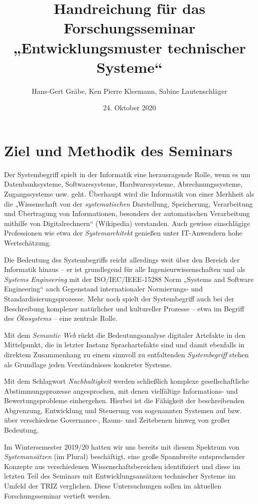 \documentclass[11pt,a4paper]{article}
\title{Handreichung für das Forschungsseminar\\ „Entwicklungsmuster
  technischer Systeme“}
\author{Hans-Gert Gr\"abe, Ken Pierre Kleemann, Sabine Lautenschläger}
\date{24. Oktober 2020}
\begin{document}
\maketitle

\section{Ziel und Methodik des Seminars}

Der Systembegriff spielt in der Informatik eine herausragende Rolle, wenn es
um Datenbanksysteme, Softwaresysteme, Hardwaresysteme, Abrechnungssysteme,
Zugangssysteme usw. geht.  Überhaupt wird die Informatik von einer Merhheit
als die „Wissenschaft von der \emph{systematischen} Darstellung, Speicherung,
Verarbeitung und Übertragung von Informationen, besonders der automatischen
Verarbeitung mithilfe von Digitalrechnern“ (Wikipedia) verstanden.  Auch
gewisse einschlägige Professionen wie etwa der \emph{Systemarchitekt} genießen
unter IT-Anwendern hohe Wertschätzung.

Die Bedeutung des Systembegriffs reicht allerdings weit über den Bereich der
Informatik hinaus -- er ist grundlegend für alle Ingenieurwissenschaften und
als \emph{Systems Engineering} mit der ISO/IEC/IEEE-15288 Norm „Systems and
Software Engineering“ auch Gegenstand internationaler Normierungs- und
Standardisierungsprozesse.  Mehr noch spielt der Systembegriff auch bei der
Beschreibung komplexer natürlicher und kultureller Prozesse -- etwa im Begriff
des \emph{Ökosystems} -- eine zentrale Rolle.

Mit dem \emph{Semantic Web} rückt die Bedeutungsanalyse digitaler Artefakte in
den Mittelpunkt, die in letzter Instanz Sprachartefakte sind und damit
ebenfalls in direktem Zusammenhang zu einem sinnvoll zu entfaltenden
\emph{Systembegriff} stehen als Grundlage jeden Verständnisses konkreter
Systeme.

Mit dem Schlagwort \emph{Nachhaltigkeit} werden schließlich komplexe
gesellschaftliche Abstimmungsprozesse angesprochen, mit denen vielfältige
Informations- und Bewertungsprobleme einhergehen. Hierbei ist die Fähigkeit
der beschreibenden Abgrenzung, Entwicklung und Steuerung von sogenannten
Systemen auf bzw. über verschiedene Governance-, Raum- und Zeitebenen hinweg
von großer Bedeutung.

Im Wintersemester 2019/20 hatten wir uns bereits mit diesem Spektrum von
\emph{Systemansätzen} (im Plural) beschäftigt, eine große Spannbreite
entsprechender Konzepte aus verschiedenen Wissenschaftsbereichen identifiziert
und diese im letzten Teil des Seminars mit Entwicklungsansätzen technischer
Systeme im Umfeld der TRIZ verglichen.  Diese Untersuchungen sollen im
aktuellen Forschungsseminar vertieft werden.
\newpage
\end{document}
